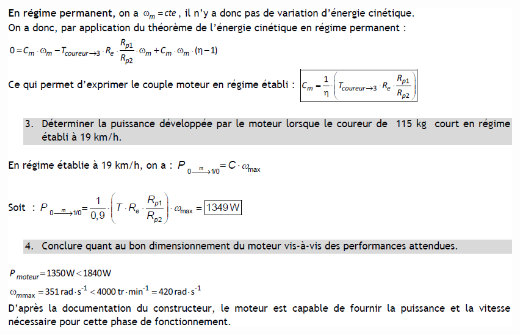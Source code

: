 \documentclass[10pt,fleqn]{article} %
\begin{document}
\begin{center}
\includegraphics[width=\linewidth]{images/cor_03.png}
\end{center}
\end{document}
